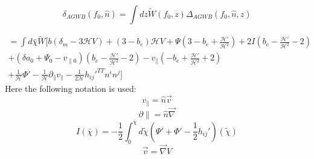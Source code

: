 \begin{equation}
    \label{window_fct_def}
        \delta_{AGWB}(f_0, \hat{n})=\int dz \tilde{W}(f_0, z)\Delta_{AGWB}(f_0, \hat{n}, z)
    \end{equation}

\begin{equation}
    \begin{split}
        = \int d\bar{\chi} \tilde{W} [b(\delta_m - 3\mathcal{H}V)+(3-b_e)\mathcal{H}V+
        \Psi(3-b_e+\frac{\mathcal{H'}}{\mathcal{H}^2})+2I(b_e
        -\frac{\mathcal{H'}}{\mathcal{H}^2}-2) \\
        +(\delta a_0+\Psi_0 - v_{\parallel 0})(b_e
        -\frac{\mathcal{H'}}{\mathcal{H}^2}-2)-v_\parallel (-b_e
        +\frac{\mathcal{H'}}{\mathcal{H}^2}+2) \\
        +\frac{1}{\mathcal{H}}\Phi' 
        -\frac{1}{\mathcal{H}}\partial_\parallel v_\parallel 
        - \frac{1}{2\mathcal{H}}h_{ij}'^{TT} n^i n^j]
    \end{split}
    \end{equation}
    Here the following notation is used:
    \begin{equation}
            v_\parallel = \hat{n} \vec{v} 
    \end{equation}
    \begin{equation}
            \partial{\parallel} = \hat{n} \vec{\nabla} 
    \end{equation}
    \begin{equation}
            I(\bar{\chi}) = -\frac{1}{2} \int_0^{\bar{\chi}} d\tilde{\chi} 
            (\Psi' + \Phi ' -\frac{1}{2}h_{ij}')(\tilde{\chi} )
    \end{equation}
    \begin{equation}
            \vec{v} = \vec{\nabla} V 
    \end{equation}


